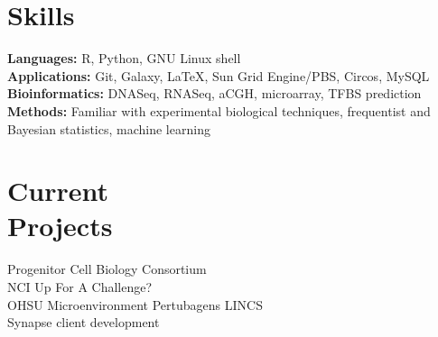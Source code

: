 \documentclass[margin,line]{res}
\begin{document}
\begin{resume}
\section{\sc Skills} 
\textbf{Languages:} R, Python, GNU Linux shell\\
\textbf{Applications:} Git, Galaxy, \LaTeX, Sun Grid Engine/PBS, Circos, MySQL\\
\textbf{Bioinformatics:} DNASeq, RNASeq, aCGH, microarray, TFBS prediction\\
\textbf{Methods:} Familiar with experimental biological techniques, frequentist and Bayesian statistics, machine learning

\section{\sc Current\\Projects}
Progenitor Cell Biology Consortium\\
NCI Up For A Challenge?\\
OHSU Microenvironment Pertubagens LINCS\\
Synapse client development



\end{resume}
\end{document}
